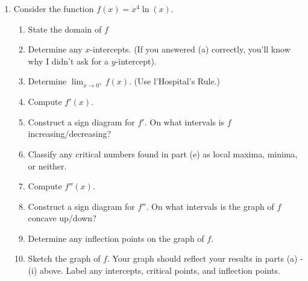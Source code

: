\documentclass[12pt]{article}
\newcommand{\points}[1]{\marginpar{\hspace{24pt}[#1]}}
\newcommand{\di}{\displaystyle}
\begin{document}
\begin{enumerate}
  \item Consider the function $f(x)=x^4\ln(x)$.
  \begin{enumerate}
  \item State the domain of $f$ \points{1}
  
  \vspace{1cm}
  
  \item Determine any $x$-intercepts. (If you answered (a) correctly, you'll know why I didn't ask for a $y$-intercept). \points{1}
  
  \vspace{2.5cm}
  
  \item Determine $\di \lim_{x\to 0^+}f(x)$. (Use l'Hospital's Rule.) \points{3}
  
  \vspace{4.5cm}
  
  \item Compute $f'(x)$. \points{2}
  
  \vspace{3.5cm}
  
  \item Construct a sign diagram for $f'$. On what intervals is $f$ increasing/decreasing? \points{2}
  
  \vspace{3cm}
  
  \item Classify any critical numbers found in part (e) as local maxima, minima, or neither. \points{1}
  
  \newpage
  
  \item Compute $f''(x)$.\points{2}
  
  \vspace{3.5cm}
  
  \item Construct a sign diagram for $f''$.  On what intervals is the graph of $f$ concave up/down? \points{2}
  
  \vspace{3cm}
  
  \item Determine any inflection points on the graph of $f$. \points{1}
  
  \vspace{2cm}
  
  \item Sketch the graph of $f$. Your graph should reflect your results in parts (a) - (i) above. Label any intercepts, critical points, and inflection points.\points{3}
  \end{enumerate}
\end{enumerate}
\end{document}
